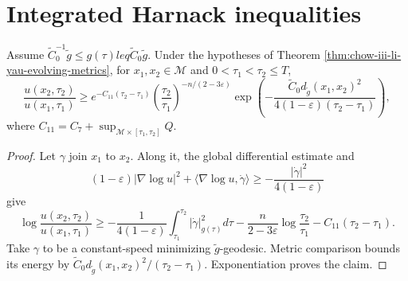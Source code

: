 \section{Integrated Harnack inequalities}

\begin{corollary}
\label{cor:chow-iii-classical-harnack-evolving-metrics}
Assume \(\widetilde C_0^{-1}\widetilde g\leq g(\tau)leq
\widetilde C_0\widetilde g\).  Under the hypotheses of Theorem
\ref{thm:chow-iii-li-yau-evolving-metrics}, for
\(x_1,x_2\in\mathcal M\) and \(0<\tau_1<\tau_2\leq T\),
\[
 \frac{u(x_2,\tau_2)}{u(x_1,\tau_1)}
 \geq e^{-C_{11}(\tau_2-\tau_1)}
 \left(\frac{\tau_2}{\tau_1}\right)^{-n/(2-3\varepsilon)}
 \exp\left(-\frac{\widetilde C_0d_{\widetilde g}(x_1,x_2)^2}
 {4(1-\varepsilon)(\tau_2-\tau_1)}\right),
\]
where \(C_{11}=C_7+\sup_{\mathcal M\times[\tau_1,\tau_2]}Q\).
\end{corollary}
\begin{proof}
Let \(\gamma\) join \(x_1\) to \(x_2\).  Along it, the global differential
estimate and
\[
 (1-\varepsilon)|\nabla\log u|^2
 +\langle\nabla\log u,\dot\gamma\rangle
 \geq-\frac{|\dot\gamma|^2}{4(1-\varepsilon)}
\]
give
\[
 \log\frac{u(x_2,\tau_2)}{u(x_1,\tau_1)}
 \geq-\frac1{4(1-\varepsilon)}\int_{\tau_1}^{\tau_2}|\dot\gamma|_{g(\tau)}^2d\tau
 -\frac n{2-3\varepsilon}\log\frac{\tau_2}{\tau_1}
 -C_{11}(\tau_2-\tau_1).
\]
Take \(\gamma\) to be a constant-speed minimizing \(\widetilde g\)-geodesic.
Metric comparison bounds its energy by
\(\widetilde C_0d_{\widetilde g}(x_1,x_2)^2/(\tau_2-\tau_1)\).
Exponentiation proves the claim.
\end{proof}


